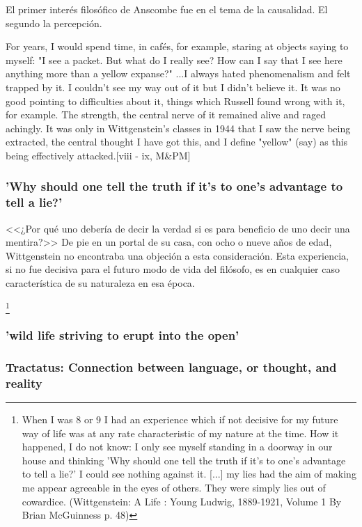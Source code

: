 \documentclass[../main.tex]{subfiles}
\begin{document}
El primer interés filosófico de Anscombe fue en el tema de la causalidad.
El segundo la percepción.

For years, I would spend time, in cafés, for example, staring at objects saying to myself: "I see a packet. But what do I really see? How can I say that I see here anything more than a yellow expanse?" ...I always hated phenomenalism and felt trapped by it. I couldn't see my way out of it but I didn't believe it. It was no good pointing to difficulties about it, things which Russell found wrong with it, for example. The strength, the central nerve of it remained alive and raged achingly. It was only in Wittgenstein's classes in 1944 that I saw the nerve being extracted, the central thought I have got this, and I define "yellow" (say) as this being effectively attacked.[viii - ix, M\&PM]

\subsubsection{'Why should one tell the truth if it's to one's advantage to tell a lie?'}
<<¿Por qué uno debería de decir la verdad si es para beneficio de uno decir una mentira?>> De pie en un portal de su casa, con ocho o nueve años de edad, Wittgenstein no encontraba una objeción a esta consideración. Esta experiencia, si no fue decisiva para el futuro modo de vida del filósofo, es en cualquier caso característica de su naturaleza en esa época. 

\footnote{When I was 8 or 9 I had an experience which if not decisive for my future way of life was at any rate characteristic of my nature at the time. How it happened, I do not know: I only see myself standing in a doorway in our house and thinking 'Why should one tell the truth if it's to one's advantage to tell a lie?' I could see nothing against it. [...] my lies had the aim of making me appear agreeable in the eyes of others. They were simply lies out of cowardice. (Wittgenstein: A Life : Young Ludwig, 1889-1921, Volume 1 By Brian McGuinness p. 48)}

\subsubsection{'wild life striving to erupt into the open'}

\subsubsection{Tractatus: Connection between language, or thought, and reality}
\end{document}
